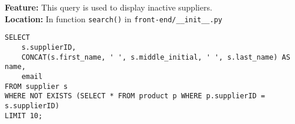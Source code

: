 \textbf{Feature:} This query is used to display inactive suppliers. \\
\textbf{Location:} In function \texttt{search()} in \texttt{front-end/\_\_init\_\_.py}

\begin{lstlisting}
SELECT
    s.supplierID,
    CONCAT(s.first_name, ' ', s.middle_initial, ' ', s.last_name) AS name,
    email
FROM supplier s
WHERE NOT EXISTS (SELECT * FROM product p WHERE p.supplierID = s.supplierID)
LIMIT 10;
\end{lstlisting}